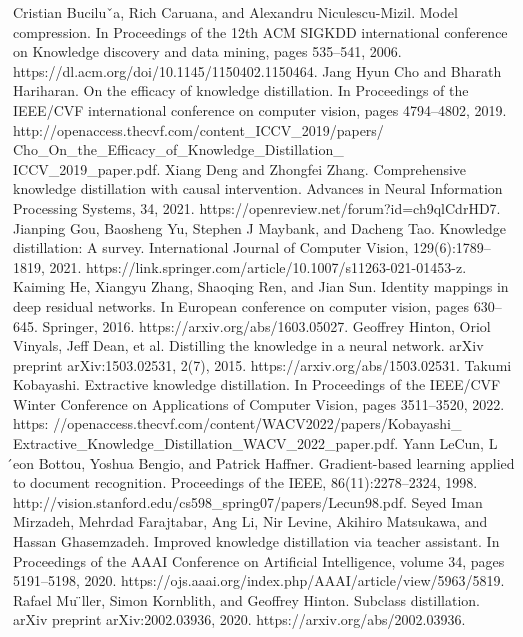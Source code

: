 \documentclass[conference]{IEEEtran}
\begin{document}
\begin{thebibliography}{00}


 Cristian Buciluˇa, Rich Caruana, and Alexandru Niculescu-Mizil. Model compression. In Proceedings of the 12th ACM SIGKDD international conference on Knowledge discovery and data mining, pages 535–541, 2006. https://dl.acm.org/doi/10.1145/1150402.1150464.
 Jang Hyun Cho and Bharath Hariharan. On the efficacy of knowledge distillation. In Proceedings of the IEEE/CVF international conference on computer vision, pages 4794–4802, 2019. http://openaccess.thecvf.com/content\_ICCV\_2019/papers/\\Cho\_On\_the\_Efficacy\_of\_Knowledge\_Distillation\_\\ICCV\_2019\_paper.pdf.
 Xiang Deng and Zhongfei Zhang. Comprehensive knowledge distillation with causal intervention. Advances in Neural Information Processing Systems, 34, 2021. https://openreview.net/forum?id=ch9qlCdrHD7.
 Jianping Gou, Baosheng Yu, Stephen J Maybank, and Dacheng Tao. Knowledge distillation: A survey. International Journal of Computer Vision, 129(6):1789–1819, 2021. https://link.springer.com/article/10.1007/s11263-021-01453-z.
 Kaiming He, Xiangyu Zhang, Shaoqing Ren, and Jian Sun. Identity mappings in deep residual networks. In European conference on computer vision, pages 630–645. Springer, 2016. https://arxiv.org/abs/1603.05027.
 Geoffrey Hinton, Oriol Vinyals, Jeff Dean, et al. Distilling the knowledge in a neural network. arXiv preprint arXiv:1503.02531, 2(7), 2015. https://arxiv.org/abs/1503.02531.
 Takumi Kobayashi. Extractive knowledge distillation. In Proceedings of the IEEE/CVF Winter Conference on Applications of Computer Vision, pages 3511–3520, 2022. https: //openaccess.thecvf.com/content/WACV2022/papers/Kobayashi\_\\Extractive\_Knowledge\_Distillation\_WACV\_2022\_paper.pdf.
 Yann LeCun, L ́eon Bottou, Yoshua Bengio, and Patrick Haffner. Gradient-based learning applied to document recognition. Proceedings of the IEEE, 86(11):2278–2324, 1998. http://vision.stanford.edu/cs598\_spring07/papers/Lecun98.pdf.
 Seyed Iman Mirzadeh, Mehrdad Farajtabar, Ang Li, Nir Levine, Akihiro Matsukawa, and Hassan Ghasemzadeh. Improved knowledge distillation via teacher assistant. In Proceedings of the AAAI Conference on Artificial Intelligence, volume 34, pages 5191–5198, 2020. https://ojs.aaai.org/index.php/AAAI/article/view/5963/5819.
 Rafael Mu ̈ller, Simon Kornblith, and Geoffrey Hinton. Subclass distillation. arXiv preprint arXiv:2002.03936, 2020. https://arxiv.org/abs/2002.03936.

\end{thebibliography}
\end{document}
